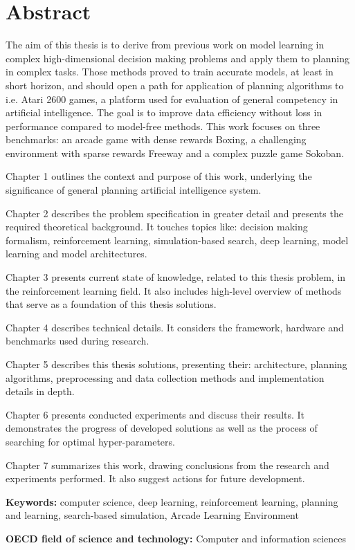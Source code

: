 \section*{Abstract}

The aim of this thesis is to derive from previous work on model learning in complex high-dimensional decision making problems and apply them to planning in complex tasks. Those methods proved to train accurate models, at least in short horizon, and should open a path for application of planning algorithms to i.e. Atari 2600 games, a platform used for evaluation of general competency in artificial intelligence. The goal is to improve data efficiency without loss in performance compared to model-free methods. This work focuses on three benchmarks: an arcade game with dense rewards Boxing, a challenging environment with sparse rewards Freeway and a complex puzzle game Sokoban.

Chapter 1 outlines the context and purpose of this work, underlying the significance of general planning artificial intelligence system. 

Chapter 2 describes the problem specification in greater detail and presents the required theoretical background. It touches topics like: decision making formalism, reinforcement learning, simulation-based search, deep learning, model learning and model architectures.

Chapter 3 presents current state of knowledge, related to this thesis problem, in the reinforcement learning field. It also includes high-level overview of methods that serve as a foundation of this thesis solutions.

Chapter 4 describes technical details. It considers the framework, hardware and benchmarks used during research.

Chapter 5 describes this thesis solutions, presenting their: architecture, planning algorithms, preprocessing and data collection methods and implementation details in depth.

Chapter 6 presents conducted experiments and discuss their results. It demonstrates the progress of developed solutions as well as the process of searching for optimal hyper-parameters.

Chapter 7 summarizes this work, drawing conclusions from the research and experiments performed. It also suggest actions for future development.

\vspace{1cm}
\noindent
\textbf{Keywords:} computer science, deep learning, reinforcement learning, planning and learning, search-based simulation, Arcade Learning Environment

\vspace{1cm}
\noindent
\textbf{OECD field of science and technology:} Computer and information sciences
